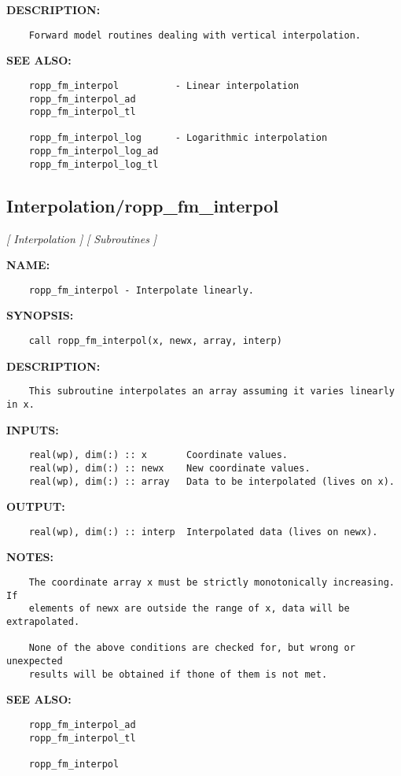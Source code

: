 \label{ch:robo92}
\label{ch:VerticalLevels_Interpolation}
\textbf{DESCRIPTION:}\hspace{0.08in}\begin{Verbatim}
    Forward model routines dealing with vertical interpolation.
\end{Verbatim}
\textbf{SEE ALSO:}\hspace{0.08in}\begin{Verbatim}
    ropp_fm_interpol          - Linear interpolation
    ropp_fm_interpol_ad
    ropp_fm_interpol_tl

    ropp_fm_interpol_log      - Logarithmic interpolation
    ropp_fm_interpol_log_ad
    ropp_fm_interpol_log_tl
\end{Verbatim}
\subsection{Interpolation/ropp\_fm\_interpol}
\textsl{[ Interpolation ]}
\textsl{[ Subroutines ]}

\label{ch:robo49}
\label{ch:Interpolation_ropp_fm_interpol}
\textbf{NAME:}\hspace{0.08in}\begin{Verbatim}
    ropp_fm_interpol - Interpolate linearly.
\end{Verbatim}
\textbf{SYNOPSIS:}\hspace{0.08in}\begin{Verbatim}
    call ropp_fm_interpol(x, newx, array, interp)
\end{Verbatim}
\textbf{DESCRIPTION:}\hspace{0.08in}\begin{Verbatim}
    This subroutine interpolates an array assuming it varies linearly in x.
\end{Verbatim}
\textbf{INPUTS:}\hspace{0.08in}\begin{Verbatim}
    real(wp), dim(:) :: x       Coordinate values.
    real(wp), dim(:) :: newx    New coordinate values.
    real(wp), dim(:) :: array   Data to be interpolated (lives on x).
\end{Verbatim}
\textbf{OUTPUT:}\hspace{0.08in}\begin{Verbatim}
    real(wp), dim(:) :: interp  Interpolated data (lives on newx).
\end{Verbatim}
\textbf{NOTES:}\hspace{0.08in}\begin{Verbatim}
    The coordinate array x must be strictly monotonically increasing. If
    elements of newx are outside the range of x, data will be extrapolated.

    None of the above conditions are checked for, but wrong or unexpected
    results will be obtained if thone of them is not met. 
\end{Verbatim}
\textbf{SEE ALSO:}\hspace{0.08in}\begin{Verbatim}
    ropp_fm_interpol_ad
    ropp_fm_interpol_tl

    ropp_fm_interpol
\end{Verbatim}
